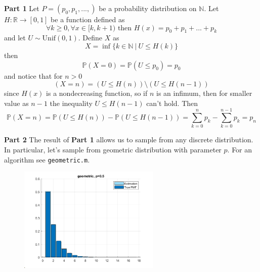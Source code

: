 \documentclass[12pt]{article}
\begin{document}
\textbf{Part 1} Let $P = (p_0, p_1, ..., )$ be a probability distribution on $\mathbb{N}$. Let $H : \mathbb{R} \to [0, 1]$ be a function defined as 
\begin{equation}
    \forall k \geq 0, \forall x \in [k, k+1) \text{ then } H(x) = p_0 + p_1 + ... + p_k
\end{equation}
and let $U \sim \text{Unif}(0, 1)$. Define $X$ as 
\begin{equation}
    X = \inf \{k \in \mathbb{N} \ | \ U \leq  H(k)\}
\end{equation}
then 
\begin{equation}
    \mathbb{P}(X=0) = \mathbb{P}(U \leq p_0) = p_0
\end{equation}
and notice that for $n > 0$
\begin{equation}
    (X = n) = (U \leq H(n)) \setminus (U \leq H(n-1))
\end{equation}
since $H(x)$ is a nondecreasing function, so if $n$ is an infimum, then for smaller value as $n-1$ the inequality $U \leq H(n-1)$ can't hold. Then 
\begin{equation}
    \mathbb{P}(X=n) = \mathbb{P}(U \leq H(n)) - \mathbb{P}(U \leq H(n-1)) = \sum_{k=0}^{n}{p_k} - \sum_{k=0}^{n-1}{p_k} = p_n
\end{equation}

\noindent \textbf{Part 2} The result of \textbf{Part 1} allows us to sample from any discrete distribution. In particular, let's sample from geometric distribution with parameter $p$. For an algorithm see \verb|geometric.m|.

\begin{figure}[h!]
    \centering
    \includegraphics[width=0.6\textwidth]{plot3.png}
\end{figure}
\end{document}

